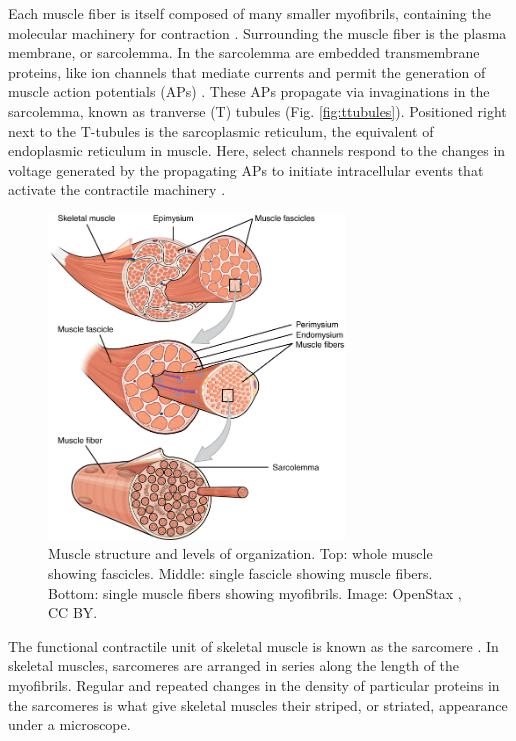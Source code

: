 \documentclass[12pt]{article}
\begin{document}
Each muscle fiber is itself composed of many smaller myofibrils, containing the molecular machinery for contraction \cite{openStax2016muscle}. Surrounding the muscle fiber is the plasma membrane, or sarcolemma. In the sarcolemma are embedded transmembrane proteins, like ion channels that mediate currents and permit the generation of muscle action potentials (APs) \cite{openStax2016muscle}. These APs propagate via invaginations in the sarcolemma, known as tranverse (T) tubules (Fig. \ref{fig:ttubules}). Positioned right next to the T-tubules is the sarcoplasmic reticulum, the equivalent of endoplasmic reticulum in muscle. Here, select channels respond to the changes in voltage generated by the propagating APs to initiate intracellular events that activate the contractile machinery \cite{openStax2016muscle}.

\begin{figure}[h]
\centering
\includegraphics[width=0.7\textwidth]{figures/muscleStructure.jpg}
\caption{Muscle structure and levels of organization. Top: whole
  muscle showing fascicles. Middle: single fascicle showing muscle
  fibers.  Bottom: single muscle fibers showing myofibrils. Image:
  OpenStax \cite{openStax2016muscle}, CC BY.}
\label{fig:fibers}
\end{figure}

The functional contractile unit of skeletal muscle is known as the sarcomere \cite{openStax2016muscle}. In skeletal muscles, sarcomeres are arranged in series along the length of the myofibrils. Regular and repeated changes in the density of particular proteins in the sarcomeres is what give skeletal muscles their striped, or striated, appearance under a microscope.
\end{document}

